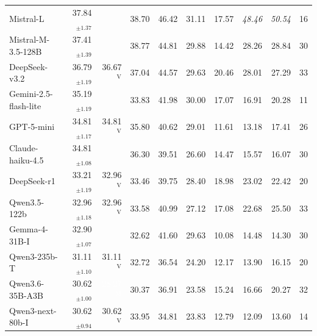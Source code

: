 \begin{tabular}{l @{\hspace{1em}} r r @{\hspace{0.5em}} r r r @{\hspace{0.5em}} r @{\hspace{1em}} r r @{\hspace{1em}} r}
Mistral-L & 37.84$_{\pm1.37}$ &  & \cellcolor[HTML]{F7F7F7}38.70 & \cellcolor[HTML]{89C0DB}46.42 & \cellcolor[HTML]{F2A07E}31.11 & 17.57 & \textit{48.46} & \textit{50.54} & 16 \\
Mistral-M-3.5-128B & 37.41$_{\pm1.39}$ &  & \cellcolor[HTML]{F7F7F7}38.77 & \cellcolor[HTML]{A8D0E4}44.81 & \cellcolor[HTML]{E7876B}29.88 & 14.42 & 28.26 & 28.84 & 30 \\
DeepSeek-v3.2 & 36.79$_{\pm1.19}$ & \cellcolor[HTML]{F8F2EE}36.67$^{\mathrm{V}}$ & \cellcolor[HTML]{F7F7F7}37.04 & \cellcolor[HTML]{8DC2DC}44.57 & \cellcolor[HTML]{F3A381}29.63 & 20.46 & 28.01 & 27.29 & 33 \\
Gemini-2.5-flash-lite & 35.19$_{\pm1.19}$ &  & \cellcolor[HTML]{F7F7F7}33.83 & \cellcolor[HTML]{80BAD8}41.98 & \cellcolor[HTML]{FDD8C4}30.00 & 17.07 & 16.91 & 20.28 & 11 \\
GPT-5-mini & 34.81$_{\pm1.17}$ & \cellcolor[HTML]{F7F7F7}34.81$^{\mathrm{V}}$ & \cellcolor[HTML]{F7F7F7}35.80 & \cellcolor[HTML]{BDDBEA}40.62 & \cellcolor[HTML]{F5AD8C}29.01 & 11.61 & 13.18 & 17.41 & 26 \\
Claude-haiku-4.5 & 34.81$_{\pm1.08}$ &  & \cellcolor[HTML]{F7F7F7}36.30 & \cellcolor[HTML]{D6E7F1}39.51 & \cellcolor[HTML]{E17860}26.60 & 14.47 & 15.57 & 16.07 & 30 \\
DeepSeek-r1 & 33.21$_{\pm1.19}$ & \cellcolor[HTML]{F9ECE4}32.96$^{\mathrm{V}}$ & \cellcolor[HTML]{F7F7F7}33.46 & \cellcolor[HTML]{A4CEE3}39.75 & \cellcolor[HTML]{FAC6AD}28.40 & 18.98 & 23.02 & 22.42 & 20 \\
Qwen3.5-122b & 32.96$_{\pm1.18}$ & \cellcolor[HTML]{F7F7F7}32.96$^{\mathrm{V}}$ & \cellcolor[HTML]{F7F7F7}33.58 & \cellcolor[HTML]{90C4DD}40.99 & \cellcolor[HTML]{F6B292}27.12 & 17.08 & 22.68 & 25.50 & 33 \\
Gemma-4-31B-I & 32.90$_{\pm1.07}$ &  & \cellcolor[HTML]{F7F7F7}32.62 & \cellcolor[HTML]{6EAED2}41.60 & \cellcolor[HTML]{FCE0D0}29.63 & 10.08 & 14.48 & 14.30 & 30 \\
Qwen3-235b-T & 31.11$_{\pm1.10}$ & \cellcolor[HTML]{F7F7F7}31.11$^{\mathrm{V}}$ & \cellcolor[HTML]{F7F7F7}32.72 & \cellcolor[HTML]{CEE4EF}36.54 & \cellcolor[HTML]{EA8E71}24.20 & 12.17 & 13.90 & 16.15 & 20 \\
Qwen3.6-35B-A3B & 30.62$_{\pm1.00}$ & \cellcolor[HTML]{BE3036}\textcolor{white}{28.27$^{\mathrm{M}}$} & \cellcolor[HTML]{F7F7F7}30.37 & \cellcolor[HTML]{9FCCE2}36.91 & \cellcolor[HTML]{F5AD8C}23.58 & 15.24 & 16.66 & 20.27 & 32 \\
Qwen3-next-80b-I & 30.62$_{\pm0.94}$ & \cellcolor[HTML]{F7F7F7}30.62$^{\mathrm{V}}$ & \cellcolor[HTML]{F7F7F7}33.95 & \cellcolor[HTML]{EEF3F5}34.81 & \cellcolor[HTML]{DD7059}23.83 & 12.79 & 12.09 & 13.60 & 14 \\

\end{tabular}

